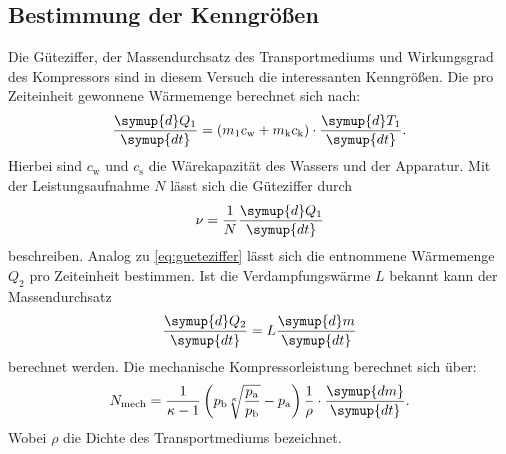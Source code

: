 \subsection{Bestimmung der Kenngrößen}
\label{sec:BdK}
Die Güteziffer, der Massendurchsatz des Transportmediums und Wirkungsgrad des Kompressors sind in diesem Versuch die
interessanten Kenngrößen.
Die pro Zeiteinheit gewonnene Wärmemenge berechnet sich nach:
\begin{equation}
	\frac{\symup{d}Q_1}{\symup{dt}}=(m_1c_{\text{w}}+m_{\text{k}}c_{\text{k}})\cdot \frac{\symup{d}T_1}{\symup{dt}}.
	\label{eq:gueteziffer}
\end{equation}
Hierbei sind $c_{\text{w}}$ und $c_{\text{s}}$ die Wärekapazität des Wassers und der Apparatur.
Mit der Leistungsaufnahme $N$ lässt sich die Güteziffer durch
\begin{equation}
	\nu=\frac{1}{N}\frac{\symup{d}Q_1}{\symup{dt}}
    \label{eq:leistung}
\end{equation}
beschreiben.
Analog zu \eqref{eq:gueteziffer} lässt sich die entnommene Wärmemenge $Q_2$ pro Zeiteinheit bestimmen.
Ist die Verdampfungswärme $L$ bekannt kann der Massendurchsatz
\begin{equation}
	\frac{\symup{d}Q_2}{\symup{dt}}=L\frac{\symup{d}m}{\symup{dt}}
	\label{eq:massendurchsatz}
\end{equation}
berechnet werden.
Die mechanische Kompressorleistung berechnet sich über:
\begin{equation}
	N_{\text{mech}} = \frac{1}{\kappa - 1} \left( p_{\text{b}} \sqrt[\kappa]{\frac{p_{\text{a}}}{p_{\text{b}}}} -p_{\text{a}}
\right) \frac{1}{\rho} \cdot \frac{\symup{dm}}{\symup{dt}} .
	\label{eq:arbeit}
\end{equation}
Wobei $\rho$ die Dichte des Transportmediums bezeichnet.
